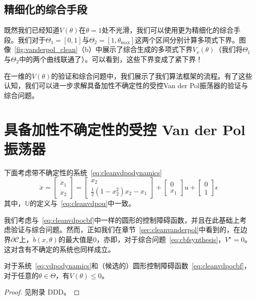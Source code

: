 \subsection{精细化的综合手段}
既然我们已经知道$V(\theta)$在$\theta = 1$处不光滑，我们可以使用更为精细化的综合手段。我们对于$\Theta_1 = [0, 1]$与$\Theta_2 = [1, \theta_{\max}]$这两个区间分别计算多项式下界。图像~\ref{fig:vanderpol_clean}（b）中展示了综合生成的多项式下界$V_\nu(\theta)$（我们将$\Theta_1$与$\Theta_2$中的两个曲线联通了）。可以看到，这些下界变成了紧下界！

在一维的$V(\theta)$的验证和综合问题中，我们展示了我们算法框架的流程。有了这些认知，我们可以进一步求解具备加性不确定性的受控Van der Pol振荡器的验证与综合问题。

\section{具备加性不确定性的受控 Van der Pol 振荡器}
\label{sec:uncertainvanderpol}

下面考虑带不确定性的系统~\eqref{eq:cleanvdpodynamics}
\begin{equation}\label{eq:vdpodynamics}
    \dot{x} = \left[ \begin{array}{c}
        \dot{x}_1 \\ \dot{x}_2
    \end{array} \right] 
    = \left[ \begin{array}{c}
        x_2 \\
        \frac{1}{2}(1 - x_2^2) x_2 - x_1
    \end{array} \right]
    + \left[ \begin{array}{c}
        0 \\ x_1
    \end{array} \right] u
    + \left[ \begin{array}{c}
        0 \\ 1
    \end{array} \right] \epsilon
\end{equation}
其中，$\mathbb{U}$的定义与~\eqref{eq:cleanvdpou}中一致。

我们考虑与~\eqref{eq:cleanvdpocbf}中一样的圆形的控制障碍函数，并且在此基础上考虑验证与综合问题。然而，正如我们在章节~\ref{sec:cleanvanderpol}中看到的，在边界$\partial \mathcal{C}$上，$\dot{b}(x, \theta)$的最大值是$0$，亦即，对于综合问题~\eqref{eq:cbfsynthesis}，$V^\star = 0$。这对含有不确定的系统也同样成立。

\begin{proposition}\label{prop:wrongvdpocbf}
    对于系统~\eqref{eq:vdpodynamics}和（候选的）圆形控制障碍函数~\eqref{eq:cleanvdpocbf}，对于任意的$\theta \in \Theta$，有$V(\theta) \le 0$。
\end{proposition}
\begin{proof}
    见附录{\color{red} DDD}。
\end{proof}

